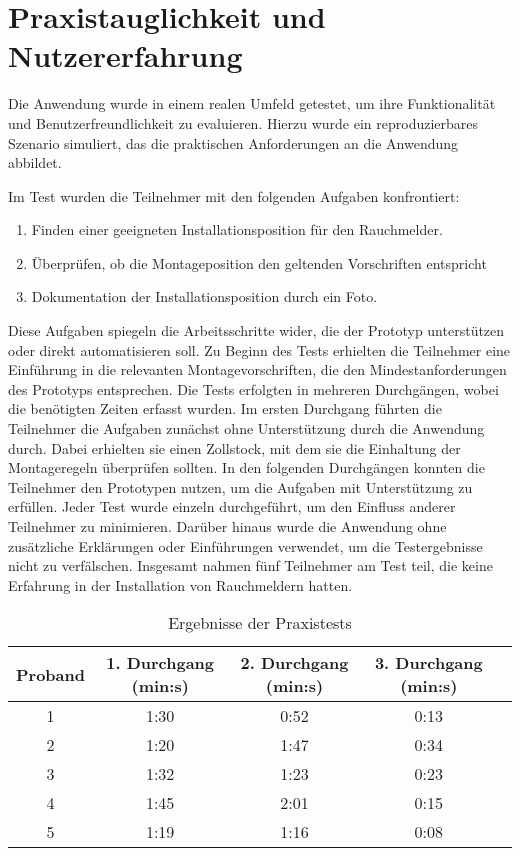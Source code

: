 \section{Praxistauglichkeit und Nutzererfahrung}

Die Anwendung wurde in einem realen Umfeld getestet, um ihre Funktionalität und Benutzerfreundlichkeit zu evaluieren. Hierzu wurde ein reproduzierbares Szenario simuliert, das die praktischen Anforderungen an die Anwendung abbildet.

Im Test wurden die Teilnehmer mit den folgenden Aufgaben konfrontiert:
\begin{enumerate}
    \item Finden einer geeigneten Installationsposition für den Rauchmelder.
    \item Überprüfen, ob die Montageposition den geltenden Vorschriften entspricht
    \item Dokumentation der Installationsposition durch ein Foto.
\end{enumerate}

Diese Aufgaben spiegeln die Arbeitsschritte wider, die der Prototyp unterstützen oder direkt automatisieren soll. Zu Beginn des Tests erhielten die Teilnehmer eine Einführung in die relevanten Montagevorschriften, die den Mindestanforderungen des Prototyps entsprechen. Die Tests erfolgten in mehreren Durchgängen, wobei die benötigten Zeiten erfasst wurden. Im ersten Durchgang führten die Teilnehmer die Aufgaben zunächst ohne Unterstützung durch die Anwendung durch. Dabei erhielten sie einen Zollstock, mit dem sie die Einhaltung der Montageregeln überprüfen sollten. In den folgenden Durchgängen konnten die Teilnehmer den Prototypen nutzen, um die Aufgaben mit Unterstützung zu erfüllen. Jeder Test wurde einzeln durchgeführt, um den Einfluss anderer Teilnehmer zu minimieren. Darüber hinaus wurde die Anwendung ohne zusätzliche Erklärungen oder Einführungen verwendet, um die Testergebnisse nicht zu verfälschen. Insgesamt nahmen fünf Teilnehmer am Test teil, die keine Erfahrung in der Installation von Rauchmeldern hatten.

\begin{table}[ht]
    \centering
    \begin{tabular}{ccccl}
        \hline
        Proband & 1. Durchgang (min:s) & 2. Durchgang (min:s) & 3. Durchgang (min:s) \\
        \hline
        1 & 1:30 & 0:52 & 0:13 \\
        2 & 1:20 & 1:47 & 0:34 \\
        3 & 1:32 & 1:23 & 0:23 \\
        4 & 1:45 & 2:01 & 0:15 \\
        5 & 1:19 & 1:16 & 0:08 \\
        \hline
    \end{tabular}
    \caption{Ergebnisse der Praxistests}
    \label{tab:TestResults}
\end{table}

